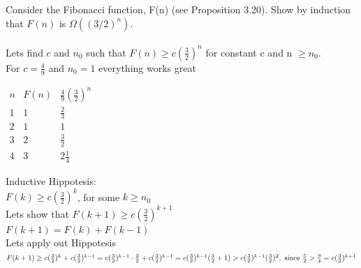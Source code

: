 \documentclass{article}
\begin{document}
Consider the Fibonacci function, F(n) (see Proposition 3.20). Show by
induction that $F(n)$ is $\Omega((3/2)^n)$.\\\\

Lets find $c$ and $n_{0}$ such that $F(n) \geq c(\frac{3}{2})^{n}$ for constant c and n $\geq n_0$.\\
For $c = \frac{4}{9}$ and $n_{0} = 1$ everything works great\\
\begin{center}
	$
	\begin{array}{ccc}
	n	& F(n) & \frac{4}{9} (\frac{3}{2})^n \\ 
	1	& 1 & \frac{2}{3} \\ 
	2	& 1 & 1 \\ 
	3	& 2 & \frac{3}{2} \\
	4	& 3 & 2\frac{1}{4}
	\end{array} 
	$
\end{center}
Inductive Hippotesis:\\
$F(k) \geq c(\frac{3}{2})^{k}$, for some $k \geq n_0$\\
Lets show that $F(k+1) \geq c(\frac{3}{2})^{k+1}$\\

$F(k+1) = F(k) + F(k-1)$\\
Lets apply out Hippotesis\\
\begin{math}
F(k+1) \geq c(\frac{3}{2})^{k} + c(\frac{3}{2})^{k-1}\\
= c(\frac{3}{2})^{k-1}\cdot\frac{3}{2} + c(\frac{3}{2})^{k-1}\\
= c(\frac{3}{2})^{k-1}(\frac{3}{2}+1)\\
> c(\frac{3}{2})^{k-1}(\frac{3}{2})^{2}, \textnormal{ since } \frac{5}{2} > \frac{9}{4} \\
= c(\frac{3}{2})^{k+1}
\end{math}



	
\end{document}
